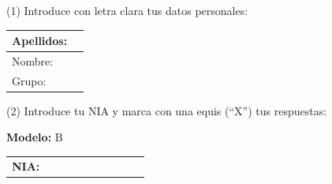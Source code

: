 \documentclass[a4paper,11pt]{article}
\begin{document}


\begin{center}
(1) Introduce con letra clara tus datos personales:
\end{center}

\begin{center}
\large

\begin{tabular}{|l|p{12cm}|}
\hline
Apellidos:   &  \\
\hline
Nombre: &    \\
\hline
Grupo:   &  \\
\hline
\end{tabular}
\end{center}


\begin{center}
(2) Introduce tu NIA y marca con una equis (``X'') tus respuestas:
\end{center}

\begin{center}
\large
\textbf{Modelo:} B
\end{center}

\begin{center}
\Large
\begin{tabular}{l|p{0.3cm}|p{0.3cm}|p{0.3cm}|p{0.3cm}|p{0.3cm}|p{0.3cm}|p{0.3cm}|p{0.3cm}|p{0.3cm}|}
\cline{2-10}
\textbf{NIA:} & & & & & & & & & \\
\cline{2-10}
\end{tabular}
\end{center}
\end{document}
